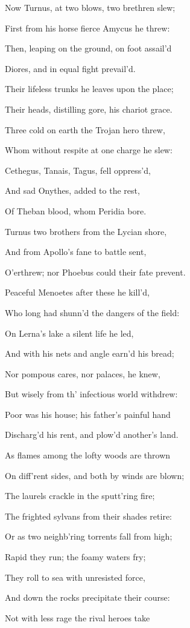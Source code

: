 Now Turnus, at two blows, two brethren slew;

First from his horse fierce Amycus he threw:

Then, leaping on the ground, on foot assail’d

Diores, and in equal fight prevail’d.

Their lifeless trunks he leaves upon the place;

Their heads, distilling gore, his chariot grace.

Three cold on earth the Trojan hero threw,

Whom without respite at one charge he slew:

Cethegus, Tanais, Tagus, fell oppress’d,

And sad Onythes, added to the rest,

Of Theban blood, whom Peridia bore.

Turnus two brothers from the Lycian shore,

And from Apollo’s fane to battle sent,

O’erthrew; nor Phoebus could their fate prevent.

Peaceful Menoetes after these he kill’d,

Who long had shunn’d the dangers of the field:

On Lerna’s lake a silent life he led,

And with his nets and angle earn’d his bread;

Nor pompous cares, nor palaces, he knew,

But wisely from th’ infectious world withdrew:

Poor was his house; his father’s painful hand

Discharg’d his rent, and plow’d another’s land.

As flames among the lofty woods are thrown

On diff’rent sides, and both by winds are blown;

The laurels crackle in the sputt’ring fire;

The frighted sylvans from their shades retire:

Or as two neighb’ring torrents fall from high;

Rapid they run; the foamy waters fry;

They roll to sea with unresisted force,

And down the rocks precipitate their course:

Not with less rage the rival heroes take

